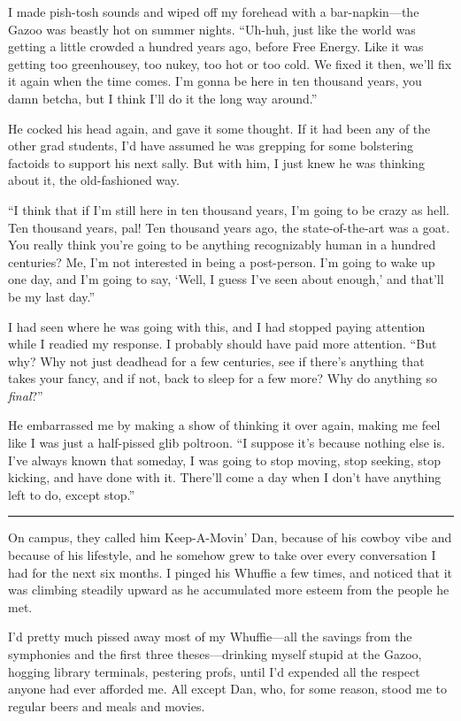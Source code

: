 I made pish-tosh sounds and wiped off my forehead with a
bar-napkin—the Gazoo was beastly hot on summer nights. “Uh-huh,
just like the world was getting a little crowded a hundred years
ago, before Free Energy. Like it was getting too greenhousey, too
nukey, too hot or too cold. We fixed it then, we'll fix it again
when the time comes. I'm gonna be here in ten thousand years, you
damn betcha, but I think I'll do it the long way around.”

He cocked his head again, and gave it some thought. If it had been
any of the other grad students, I'd have assumed he was grepping
for some bolstering factoids to support his next sally. But with
him, I just knew he was thinking about it, the old-fashioned way.

“I think that if I'm still here in ten thousand years, I'm going to
be crazy as hell. Ten thousand years, pal! Ten thousand years ago,
the state-of-the-art was a goat. You really think you're going to
be anything recognizably human in a hundred centuries? Me, I'm not
interested in being a post-person. I'm going to wake up one day,
and I'm going to say, ‘Well, I guess I've seen about enough,’ and
that'll be my last day.”

I had seen where he was going with this, and I had stopped paying
attention while I readied my response. I probably should have paid
more attention. “But why? Why not just deadhead for a few
centuries, see if there's anything that takes your fancy, and if
not, back to sleep for a few more? Why do anything so
\emph{final}?”

He embarrassed me by making a show of thinking it over again,
making me feel like I was just a half-pissed glib poltroon. “I
suppose it's because nothing else is. I've always known that
someday, I was going to stop moving, stop seeking, stop kicking,
and have done with it. There'll come a day when I don't have
anything left to do, except stop.”

\begin{center}\rule{3in}{0.4pt}\end{center}

On campus, they called him Keep-A-Movin' Dan, because of his cowboy
vibe and because of his lifestyle, and he somehow grew to take over
every conversation I had for the next six months. I pinged his
Whuffie a few times, and noticed that it was climbing steadily
upward as he accumulated more esteem from the people he met.

I'd pretty much pissed away most of my Whuffie—all the savings from
the symphonies and the first three theses—drinking myself stupid at
the Gazoo, hogging library terminals, pestering profs, until I'd
expended all the respect anyone had ever afforded me. All except
Dan, who, for some reason, stood me to regular beers and meals and
movies.

